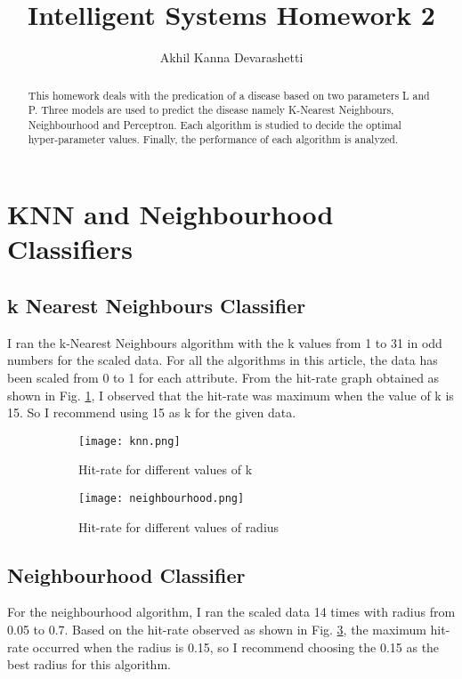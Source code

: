 \documentclass[a4paper,11pt]{article}
\title{Intelligent Systems Homework 2}
\author{Akhil Kanna Devarashetti}
\begin{document}
\maketitle

\begin{abstract}
This homework deals with the predication of a disease based on two parameters L and P. Three models are used to predict the disease namely K-Nearest Neighbours, Neighbourhood and Perceptron. Each algorithm is studied to decide the optimal hyper-parameter values. Finally, the performance of each algorithm is analyzed.
\end{abstract}

\section{KNN and Neighbourhood Classifiers}
\subsection{k Nearest Neighbours Classifier}
I ran the k-Nearest Neighbours algorithm with the k values from 1 to 31 in odd numbers for the scaled data. For all the algorithms in this article, the data has been scaled from 0 to 1 for each attribute. From the hit-rate graph obtained as shown in Fig. \ref{fig:1.1a}, I observed that the hit-rate was maximum when the value of k is 15. So I recommend using 15 as k for the given data.

\begin{figure}[ht]
    \centering
    \begin{subfigure}[b]{0.49\linewidth}
        \texttt{[image: knn.png]}
        \caption{Hit-rate for different values of k}
        \label{fig:1.1a}
    \end{subfigure}
    \begin{subfigure}[b]{0.49\linewidth}
        \texttt{[image: neighbourhood.png]}
        \caption{Hit-rate for different values of radius}
        \label{fig:1.1b}
    \end{subfigure}
    \caption{}
\end{figure}

\subsection{Neighbourhood Classifier}
For the neighbourhood algorithm, I ran the scaled data 14 times with radius from 0.05 to 0.7. Based on the hit-rate observed as shown in Fig. \ref{fig:1.1b}, the maximum hit-rate occurred when the radius is 0.15, so I recommend choosing the 0.15 as the best radius for this algorithm.
\end{document}

